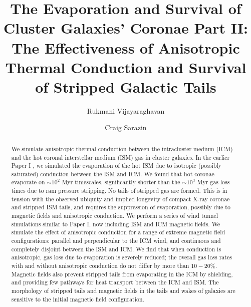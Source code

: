 \documentclass[twocolumn]{aastex6}
\begin{document}
\title{The Evaporation and Survival of Cluster Galaxies' Coronae Part II: The Effectiveness of Anisotropic Thermal Conduction and Survival of Stripped Galactic Tails}
\author{Rukmani Vijayaraghavan}
\author{Craig Sarazin}

\begin{abstract}
We simulate anisotropic thermal conduction between the intracluster medium (ICM) and the hot coronal interstellar medium (ISM) gas in cluster galaxies. In the earlier Paper I \citep{Vijayaraghavan17b}, we simulated the evaporation of the hot ISM due to isotropic (possibly saturated) conduction between the ISM and ICM. We found that hot coronae evaporate on $\sim 10^2$ Myr timescales, significantly shorter than the $\sim 10^3$ Myr gas loss times due to ram pressure stripping. No tails of stripped gas are formed. This is in tension with the observed ubiquity and implied longevity of compact X-ray coronae and stripped ISM tails, and requires the suppression of evaporation, possibly due to magnetic fields and anisotropic conduction. We perform a series of wind tunnel simulations similar to Paper I, now including ISM and ICM magnetic fields. We simulate the effect of anisotropic conduction for a range of extreme magnetic field configurations: parallel and perpendicular to the ICM wind, and continuous and completely disjoint between the ISM and ICM. We find that when conduction is anisotropic, gas loss due to evaporation is severely reduced; the overall gas loss rates with and without anisotropic conduction do not differ by more than $10 - 20\%$. Magnetic fields also prevent stripped tails from evaporating in the ICM by shielding, and providing few pathways for heat transport between the ICM and ISM. The morphology of stripped tails and magnetic fields in the tails and wakes of galaxies are sensitive to the initial magnetic field configuration.
\end{abstract}

%
%

\maketitle
\end{document}
